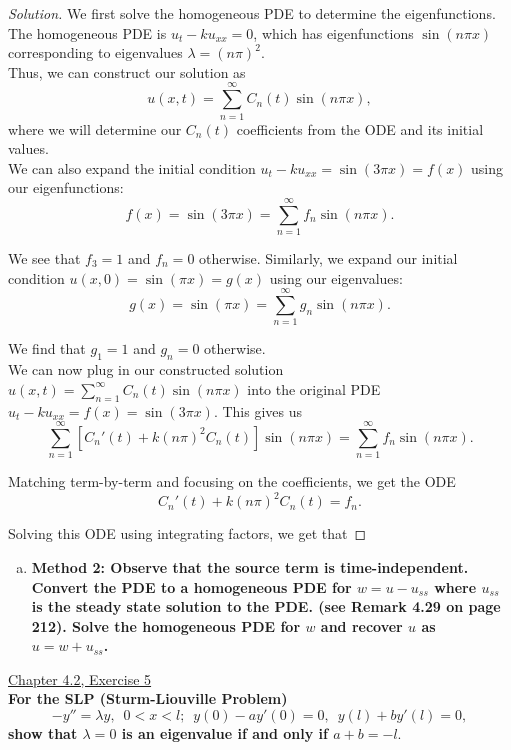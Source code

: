 \documentclass[11pt]{article}
\newenvironment{solution}
  {\renewcommand\qedsymbol{$\blacksquare$}\begin{proof}[Solution]}
  {\end{proof}}
\begin{document}
\begin{solution}
We first solve the homogeneous PDE to determine the eigenfunctions. The homogeneous PDE is $u_t - ku_{xx} = 0$, which has eigenfunctions $\sin(n\pi x)$ corresponding to eigenvalues $\lambda = (n\pi)^2.$ \\

Thus, we can construct our solution as 
\[ u(x, t) = \sum\limits_{n=1}^{\infty} C_n(t) \sin(n\pi x), \] where we will determine our $C_n(t)$ coefficients from the ODE and its initial values. \\

We can also expand the initial condition $u_t - ku_{xx} = \sin(3\pi x) = f(x)$ using our eigenfunctions:
\[ f(x) = \sin(3\pi x) = \sum\limits_{n=1}^{\infty} f_n\sin(n\pi x). \]

We see that $f_3 = 1$ and $f_n = 0$ otherwise. Similarly, we expand our initial condition $u(x, 0) = \sin(\pi x) = g(x)$ using our eigenvalues:
\[ g(x) = \sin(\pi x) = \sum\limits_{n=1}^{\infty} g_n\sin(n\pi x). \]

We find that $g_1 = 1$ and $g_n = 0$ otherwise. \\

We can now plug in our constructed solution $u(x, t) = \sum\limits_{n=1}^{\infty} C_n(t) \sin(n\pi x)$ into the original PDE $u_t - ku_{xx} = f(x) = \sin(3\pi x).$ This gives us
\[ \sum\limits_{n=1}^{\infty}\left[C_n'(t) + k(n\pi)^2 C_n(t) \right]\sin(n\pi x) = \sum\limits_{n=1}^{\infty} f_n \sin(n\pi x). \]

Matching term-by-term and focusing on the coefficients, we get the ODE
\[ C_n'(t) + k(n\pi)^2 C_n(t) = f_n.\]

Solving this ODE using integrating factors, we get that
\end{solution}

\begin{enumerate}[(b)]
    \item \textbf{Method 2: Observe that the source term is time-independent. Convert the PDE to a homogeneous PDE for $w = u - u_{ss}$ where $u_{ss}$ is the steady state solution to the PDE.
    (see Remark 4.29 on page 212). Solve the homogeneous PDE for $w$ and recover $u$ as $u = w + u_{ss}$.}
\end{enumerate}

\newpage

\underline{Chapter 4.2, Exercise 5} \\

\textbf{For the SLP (Sturm-Liouville Problem)} \[-y'' = \lambda y, \, \, \, 0 < x < l; \, \, \, y(0) - ay'(0) = 0, \, \, \, y(l) + by'(l) = 0,\]
\textbf{show that $\lambda = 0$ is an eigenvalue if and only if $a+b = -l.$} \\
\end{document}
